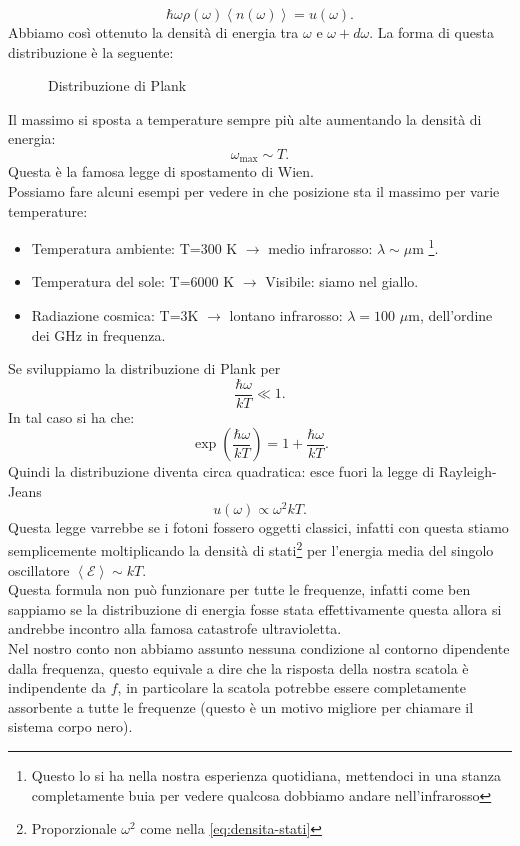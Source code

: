 \[
	\hbar \omega  \rho ( \omega ) \left<n( \omega )  \right> = u( \omega ) 
.\] 
Abbiamo così ottenuto la densità di energia tra $\omega $ e $\omega + d\omega $. La forma di questa distribuzione è la seguente:
\begin{figure}[H]
    \centering
    \caption{Distribuzione di Plank}
    \label{fig:distribuzione-di-plank}
\end{figure}
\noindent
Il massimo si sposta a temperature sempre più alte aumentando la densità di energia:
\[
	\omega _{\text{max}} \sim T
.\] 
Questa è la famosa legge di spostamento di Wien. \\
Possiamo fare alcuni esempi per vedere in che posizione sta il massimo per varie temperature:
\begin{itemize}
	\item Temperatura ambiente: T=300 K $\to $ medio infrarosso: $\lambda \sim \mu$m \footnote{Questo lo si ha nella nostra esperienza quotidiana, mettendoci in una stanza completamente buia per vedere qualcosa dobbiamo andare nell'infrarosso}.
	\item Temperatura del sole: T=6000 K $\to $ Visibile: siamo nel giallo.
	\item Radiazione cosmica: T=3K $\to $ lontano infrarosso: $\lambda = 100$ $\mu$m, dell'ordine dei GHz in frequenza.
\end{itemize}
Se sviluppiamo la distribuzione di Plank per
\[
	\frac{\hbar \omega }{kT} \ll 1
.\] 
In tal caso si ha che:
\[
	\exp\left( \frac{\hbar \omega }{kT} \right) = 1 + \frac{\hbar \omega }{kT}
.\] 
Quindi la distribuzione diventa circa quadratica: esce fuori la legge di Rayleigh-Jeans
\[
	u( \omega ) \propto \omega ^2 kT 
.\] 
Questa legge varrebbe se i fotoni fossero oggetti classici, infatti con questa stiamo semplicemente moltiplicando la densità di stati\footnote{Proporzionale $\omega ^2$ come nella \ref{eq:densita-stati}} per l'energia media del singolo oscillatore $\left<\mathcal{E}  \right> \sim kT$.\\
Questa formula non può funzionare per tutte le frequenze, infatti come ben sappiamo se la distribuzione di energia fosse stata effettivamente questa allora si andrebbe incontro alla famosa catastrofe ultravioletta.\\
Nel nostro conto non abbiamo assunto nessuna condizione al contorno dipendente dalla frequenza, questo equivale a dire che la risposta della nostra scatola è indipendente da $f$, in particolare la scatola potrebbe essere completamente assorbente a tutte le frequenze (questo è un motivo migliore per chiamare il sistema corpo nero).\\
